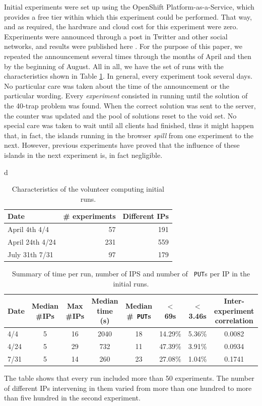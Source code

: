 \documentclass[journal,onecolumn]{IEEEtran}
\begin{document}
Initial experiments were set up using the OpenShift
Platform-as-a-Service, which provides a free tier within which this
experiment could be performed. That way, and as required, the hardware
and cloud cost for this experiment were zero. Experiments were
announced through a post in Twitter and other social networks, and
results were published here \cite{DBLP:conf/gecco/GuervosG15}. For the
purpose of this paper, we repeated the announcement several times
through the months of April and then by the beginning of August. All
in all, we have the set of runs with the characteristics shown in
Table \ref{tab:runs}. In general, every experiment took several
days. No particular care was taken about the time of the announcement
or the particular wording. Every {\em experiment} consisted in running
until the solution of the 40-trap problem was found. When the correct
solution was sent to the server, the counter was updated and the pool
of solutions reset to the void set. No special care was taken to wait
until all clients had finished, thus it might happen that, in fact,
the islands running in the browser {\em spill} from one experiment to
the next. However, previous experiments have proved that the influence
of these islands in the next experiment is, in fact negligible.
%
\begin{table}d
\caption{Characteristics of the volunteer computing initial runs. \label{tab:runs}}
\begin{center}
\begin{tabular}{l|rr}
\hline
Date & \# experiments & Different IPs \\
\hline 
April 4th 4/4 & 57 & 191 \\
April 24th 4/24 &  231 & 559 \\
July 31th 7/31 & 97 & 179 \\
\hline 
\end{tabular}
\end{center}
\end{table}
%
\begin{table}
\caption{Summary of time per run, number of IPS and number of {\tt
    PUT}s per IP in the initial runs. \label{tab:summary:os}}
\begin{center}
\begin{tabular}{l|ccccccc}
\hline
Date & Median \#IPs & Max \#IPs & Median time (s) & Median \#{\tt
  PUT}s & $<$ 69s & $<$ 3.46s & Inter-experiment correlation\\
\hline 
4/4 & 5 & 16 & 2040 & 18 & 14.29\% & 5.36\% & 0.0082 \\
4/24 &  5 & 29 & 732 & 11 & 47.39\% & 3.91\% & 0.0934\\
7/31 & 5 & 14 & 260 & 23 & 27.08\% & 1.04\%  & 0.1741\\
\hline 
\end{tabular}
\end{center}
\end{table}
%
The table shows that every run included more than 50 experiments. The
number of different IPs intervening in them varied from more than one
hundred to more than five hundred in the second experiment. 
\end{document}
